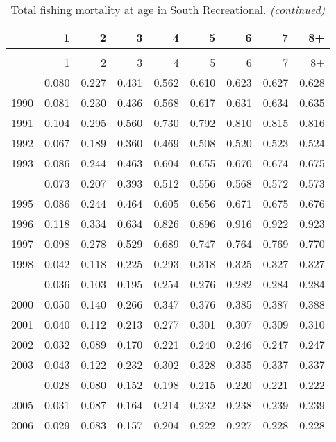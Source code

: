 \documentclass[
]{article}
\begin{document}
\begin{longtable}[t]{lrrrrrrrr}
\caption{\label{tab:South_Recreational-fleet-FAA-table}Total fishing mortality at age in South Recreational.}\\
\toprule
  & 1 & 2 & 3 & 4 & 5 & 6 & 7 & 8+\\
\midrule
\endfirsthead
\caption[]{Total fishing mortality at age in South Recreational. \textit{(continued)}}\\
\toprule
  & 1 & 2 & 3 & 4 & 5 & 6 & 7 & 8+\\
\midrule
\endhead

\endfoot
\bottomrule
\endlastfoot
1989 & 0.080 & 0.227 & 0.431 & 0.562 & 0.610 & 0.623 & 0.627 & 0.628\\
1990 & 0.081 & 0.230 & 0.436 & 0.568 & 0.617 & 0.631 & 0.634 & 0.635\\
1991 & 0.104 & 0.295 & 0.560 & 0.730 & 0.792 & 0.810 & 0.815 & 0.816\\
1992 & 0.067 & 0.189 & 0.360 & 0.469 & 0.508 & 0.520 & 0.523 & 0.524\\
1993 & 0.086 & 0.244 & 0.463 & 0.604 & 0.655 & 0.670 & 0.674 & 0.675\\
\addlinespace
1994 & 0.073 & 0.207 & 0.393 & 0.512 & 0.556 & 0.568 & 0.572 & 0.573\\
1995 & 0.086 & 0.244 & 0.464 & 0.605 & 0.656 & 0.671 & 0.675 & 0.676\\
1996 & 0.118 & 0.334 & 0.634 & 0.826 & 0.896 & 0.916 & 0.922 & 0.923\\
1997 & 0.098 & 0.278 & 0.529 & 0.689 & 0.747 & 0.764 & 0.769 & 0.770\\
1998 & 0.042 & 0.118 & 0.225 & 0.293 & 0.318 & 0.325 & 0.327 & 0.327\\
\addlinespace
1999 & 0.036 & 0.103 & 0.195 & 0.254 & 0.276 & 0.282 & 0.284 & 0.284\\
2000 & 0.050 & 0.140 & 0.266 & 0.347 & 0.376 & 0.385 & 0.387 & 0.388\\
2001 & 0.040 & 0.112 & 0.213 & 0.277 & 0.301 & 0.307 & 0.309 & 0.310\\
2002 & 0.032 & 0.089 & 0.170 & 0.221 & 0.240 & 0.246 & 0.247 & 0.247\\
2003 & 0.043 & 0.122 & 0.232 & 0.302 & 0.328 & 0.335 & 0.337 & 0.337\\
\addlinespace
2004 & 0.028 & 0.080 & 0.152 & 0.198 & 0.215 & 0.220 & 0.221 & 0.222\\
2005 & 0.031 & 0.087 & 0.164 & 0.214 & 0.232 & 0.238 & 0.239 & 0.239\\
2006 & 0.029 & 0.083 & 0.157 & 0.204 & 0.222 & 0.227 & 0.228 & 0.228\\

\end{longtable}
\end{document}
